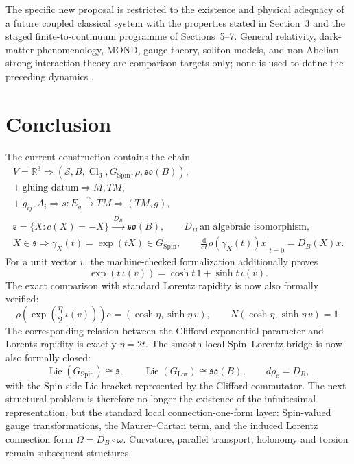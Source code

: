 \documentclass[11pt,a4paper]{article}
\theoremstyle{remark}
\newcommand{\R}{\mathbb{R}}
\newcommand{\Cl}{\operatorname{Cl}}
\newcommand{\SpinG}{G_{\mathrm{Spin}}}
\newcommand{\LorG}{G_{\mathrm{Lor}}}
\newcommand{\Smodel}{\mathcal S}
\newcommand{\soB}{\mathfrak{so}(B)}
\newcommand{\dd}{\mathrm d}
\begin{document}
The specific new proposal is restricted to the existence and physical adequacy of a future coupled classical system with the properties stated in Section~3 and the staged finite-to-continuum programme of Sections~5--7.  General relativity, dark-matter phenomenology, MOND, gauge theory, soliton models, and non-Abelian strong-interaction theory are comparison targets only; none is used to define the preceding dynamics \cite{Einstein1916,Milgrom1983,McGaugh2000,Kibble1961,Skyrme1961,YangMills1954,Wilson1974}.

\section{Conclusion}

The current construction contains the chain
\begin{equation}
\begin{gathered}
V=\R^3
\Longrightarrow
(\Smodel,B,\Cl_3,\SpinG,\rho,\soB),\\[0.4em]
+\ \text{gluing datum}
\Longrightarrow M,TM,\\[0.4em]
+\ \widetilde g_{ij},A_i
\Longrightarrow
s:E_g\xrightarrow{\sim}TM
\Longrightarrow
(TM,g),\\[0.4em]
\mathfrak s=\{X:c(X)=-X\}
\xrightarrow{\;D_B\;}\soB,
\qquad D_B\ \text{an algebraic isomorphism},\\[0.4em]
X\in\mathfrak s
\Longrightarrow
\gamma_X(t)=\exp(tX)\in\SpinG,
\qquad
\left.\frac{\dd}{\dd t}\rho(\gamma_X(t))x\right|_{t=0}=D_B(X)x.
\end{gathered}
\tag{10.1}
\end{equation}
For a unit vector \(v\), the machine-checked formalization additionally proves
\begin{equation}
  \exp(t\,\iota(v))=\cosh t\,1+\sinh t\,\iota(v).
\tag{10.2}
\end{equation}
The exact comparison with standard Lorentz rapidity is now also formally verified:
\begin{equation}
  \rho\!\left(\exp\!\left(\frac{\eta}{2}\,\iota(v)\right)\right)e
  =
  (\cosh\eta,\sinh\eta\,v),
  \qquad
  N(\cosh\eta,\sinh\eta\,v)=1.
\tag{10.3}
\end{equation}
The corresponding relation between the Clifford exponential parameter and Lorentz rapidity is exactly \(\eta=2t\).  The smooth local Spin--Lorentz bridge is now also formally closed:
\begin{equation}
  \operatorname{Lie}(\SpinG)\cong\mathfrak s,
  \qquad
  \operatorname{Lie}(\LorG)\cong\soB,
  \qquad
  d\rho_e=D_B,
\tag{10.4}
\end{equation}
with the Spin-side Lie bracket represented by the Clifford commutator.  The next structural problem is therefore no longer the existence of the infinitesimal representation, but the standard local connection-one-form layer: Spin-valued gauge transformations, the Maurer--Cartan term, and the induced Lorentz connection form \(\Omega=D_B\circ\omega\).  Curvature, parallel transport, holonomy and torsion remain subsequent structures.
\end{document}
